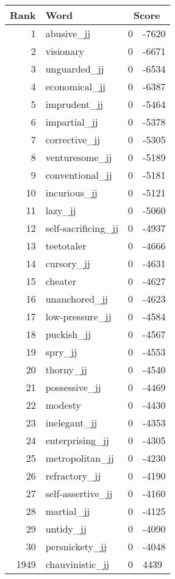 \begin{longtable}[!htbp]{| rlr@{.}l |}
    \hline
    \textbf{Rank} & \textbf{Word} & \multicolumn{2}{c|}{\textbf{Score}} \\
    \hline
    \endhead
    1 & abusive\_jj & 0 & -7620 \\
    2 & visionary & 0 & -6671 \\
    3 & unguarded\_jj & 0 & -6534 \\
    4 & economical\_jj & 0 & -6387 \\
    5 & imprudent\_jj & 0 & -5464 \\
    6 & impartial\_jj & 0 & -5378 \\
    7 & corrective\_jj & 0 & -5305 \\
    8 & venturesome\_jj & 0 & -5189 \\
    9 & conventional\_jj & 0 & -5181 \\
    10 & incurious\_jj & 0 & -5121 \\
    11 & lazy\_jj & 0 & -5060 \\
    12 & self-sacrificing\_jj & 0 & -4937 \\
    13 & teetotaler & 0 & -4666 \\
    14 & cursory\_jj & 0 & -4631 \\
    15 & cheater & 0 & -4627 \\
    16 & unanchored\_jj & 0 & -4623 \\
    17 & low-pressure\_jj & 0 & -4584 \\
    18 & puckish\_jj & 0 & -4567 \\
    19 & spry\_jj & 0 & -4553 \\
    20 & thorny\_jj & 0 & -4540 \\
    21 & possessive\_jj & 0 & -4469 \\
    22 & modesty & 0 & -4430 \\
    23 & inelegant\_jj & 0 & -4353 \\
    24 & enterprising\_jj & 0 & -4305 \\
    25 & metropolitan\_jj & 0 & -4230 \\
    26 & refractory\_jj & 0 & -4190 \\
    27 & self-assertive\_jj & 0 & -4160 \\
    28 & martial\_jj & 0 & -4125 \\
    29 & untidy\_jj & 0 & -4090 \\
    30 & persnickety\_jj & 0 & -4048 \\
    1949 & chauvinistic\_jj & 0 & 4439 \\

\end{longtable}
